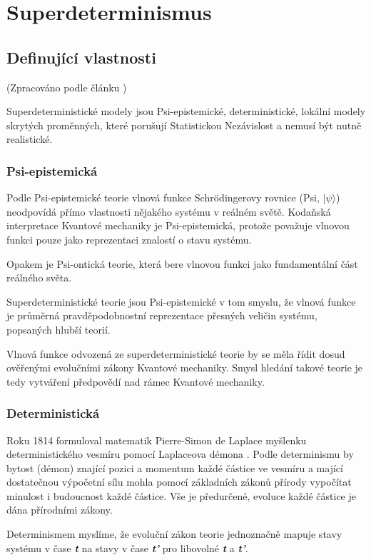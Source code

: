 \section{Superdeterminismus}
\subsection{Definující vlastnosti}
(Zpracováno podle článku \cite{supdet:rethink})

Superdeterministické modely jsou Psi-epistemické, deterministické, lokální modely skrytých proměnných, které porušují Statistickou Nezávislost a nemusí být nutně realistické.

\subsubsection{Psi-epistemická}
Podle Psi-epistemické teorie vlnová funkce Schrödingerovy rovnice (Psi, $|\psi\rangle$) neodpovídá přímo vlastnosti nějakého systému v reálném světě. Kodaňská interpretace Kvantové mechaniky je Psi-epistemická, protože považuje vlnovou funkci pouze jako reprezentaci znalostí o stavu systému.

Opakem je Psi-ontická teorie, která bere vlnovou funkci jako fundamentální část reálného světa.

Superdeterministické teorie jsou Psi-epistemické v tom smyslu, že vlnová funkce je průměrná pravděpodobnostní reprezentace přesných veličin systému, popsaných hlubší teorií.

Vlnová funkce odvozená ze superdeterministické teorie by se měla řídit dosud ověřenými evolučními zákony Kvantové mechaniky. Smysl hledání takové teorie je tedy vytváření předpovědí nad rámec Kvantové mechaniky.

\subsubsection{Deterministická}
Roku 1814 formuloval matematik Pierre-Simon de Laplace myšlenku deterministického vesmíru pomocí Laplaceova démona \parencite{laplace:demon}. Podle determinismu by bytost (démon) znající pozici a momentum každé částice ve vesmíru a mající dostatečnou výpočetní sílu mohla pomocí základních zákonů přírody vypočítat minulost i budoucnost každé částice. Vše je předurčené, evoluce každé částice je dána přírodními zákony.

Determinismem myslíme, že evoluční zákon teorie jednoznačně mapuje stavy systému v čase \textbf{\emph{t}} na stavy v čase \textbf{\emph{t'}} pro libovolné \textbf{\emph{t}} a \textbf{\emph{t'}}.

